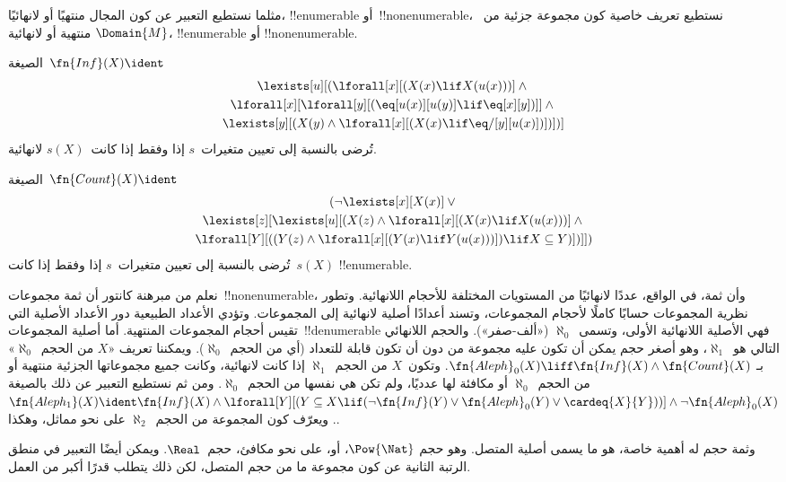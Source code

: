 \documentclass[../../../include/open-logic-section]{subfiles}
\begin{document}


\begin{explain}
مثلما نستطيع التعبير عن كون المجال منتهيًا أو لانهائيًا،
!!{enumerable} أو~!!{nonenumerable}، نستطيع تعريف خاصية كون مجموعة
جزئية من~$\Domain{M}$ منتهية أو لانهائية، !!{enumerable} أو
!!{nonenumerable}.
\end{explain}

\begin{prop}
الصيغة~$\fn{Inf}(X) \ident$
\begin{multline*}
\lexists[u][(\lforall[x][(X(x) \lif X(u(x)))] \land {}\\
  \lforall[x][\lforall[y][(\eq[u(x)][u(y)] \lif 
      \eq[x][y])]] \land {} \\\lexists[y][(X(y) \land \lforall[x][(X(x)
      \lif \eq/[y][u(x)])])])]
\end{multline*}
تُرضى بالنسبة إلى تعيين متغيرات~$s$ إذا وفقط إذا كانت~$s(X)$
لانهائية.
\end{prop}

\begin{prop}
الصيغة~$\fn{Count}(X) \ident $
\begin{multline*}
(\lnot\lexists[x][X(x)] \lor {}\\
\lexists[z][\lexists[u][(X(z) \land 
    \lforall[x][(X(x) \lif X(u(x)))] \land {} \\ \lforall[Y][((Y(z) \land
      \lforall[x][(Y(x) \lif Y(u(x)))]) \lif X \subseteq Y)])]])
\end{multline*}
تُرضى بالنسبة إلى تعيين متغيرات~$s$ إذا وفقط إذا كانت~$s(X)$
!!{enumerable}.
\end{prop}

نعلم من مبرهنة كانتور أن ثمة مجموعات~!!{nonenumerable}، وأن ثمة، في
الواقع، عددًا لانهائيًا من المستويات المختلفة للأحجام اللانهائية. وتطور
نظرية المجموعات حسابًا كاملًا لأحجام المجموعات، وتسند أعدادًا أصلية
لانهائية إلى المجموعات. وتؤدي الأعداد الطبيعية دور الأعداد الأصلية التي
تقيس أحجام المجموعات المنتهية. أما أصلية المجموعات~!!{denumerable} فهي
الأصلية اللانهائية الأولى، وتسمى~$\aleph_0$ («ألف-صفر»). والحجم
اللانهائي التالي هو~$\aleph_1$، وهو أصغر حجم يمكن أن تكون عليه مجموعة
من دون أن تكون قابلة للتعداد (أي من الحجم~$\aleph_0$). ويمكننا تعريف
«$X$ من الحجم~$\aleph_0$» بـ
$\fn{Aleph}_0(X) \liff \fn{Inf}(X) \land \fn{Count}(X)$. وتكون~$X$
من الحجم~$\aleph_1$ إذا كانت لانهائية، وكانت جميع مجموعاتها الجزئية
منتهية أو من الحجم~$\aleph_0$ أو مكافئة لها عدديًا، ولم تكن هي نفسها
من الحجم~$\aleph_0$. ومن ثم نستطيع التعبير عن ذلك بالصيغة
$\fn{Aleph_1}(X) \ident \fn{Inf}(X) \land
\lforall[Y][(Y \subseteq X \lif
  (\lnot\fn{Inf}(Y) \lor \fn{Aleph}_0(Y) \lor \cardeq{X}{Y}))] \land \lnot
\fn{Aleph}_0(X)$. ويعرّف كون المجموعة من الحجم~$\aleph_2$ على نحو
مماثل، وهكذا.

وثمة حجم له أهمية خاصة، هو ما يسمى أصلية المتصل. وهو حجم
$\Pow{\Nat}$، أو، على نحو مكافئ، حجم~$\Real$. ويمكن أيضًا التعبير في
منطق الرتبة الثانية عن كون مجموعة ما من حجم المتصل، لكن ذلك يتطلب قدرًا
أكبر من العمل.
\end{document}
